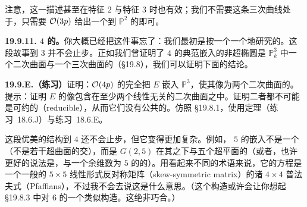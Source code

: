 注意，这一描述甚至在特征 $2$ 与特征 $3$ 时也有效；我们不需要这条三次曲线处于\trWeierstrassNormalForm，只需要 $\mathcal{O}(3p)$ 给出一个到 $\mathbb{P}^2$ 的\trClosedEmbedding{}即可。

\textbf{19.9.11. \trDegree{} $4$ 的\trLineBundle。}\quad 你大概已经把这件事忘了：我们最初是按\trDegree{}一个一个地研究\trLineBundle{}的。这段故事到\trDegree{} $3$ 并不会止步。正如我们曾证明了\trGenus{} $4$ 的典范嵌入的非超椭圆\trCurve{}是 $\mathbb{P}^3_k$ 中一个二次曲面与一个三次曲面的\trCompleteIntersection（\S19.8），我们可以证明下面的结论。

\textbf{19.9.E.（练习）}\quad 证明：$\mathcal{O}(4p)$ 的完全\trLinearSystem{}把 $E$ 嵌入 $\mathbb{P}^3$，使其像为两个二次曲面的\trCompleteIntersection。提示：证明 $E$ 的像包含在至少两个线性无关的二次曲面之中。证明二者都不可能是可约的（reducible），从而它们没有公共的\trIrreducibleComponent。仿照 \S19.8.1，使用\trBezout{}定理（\mbox{练习~18.6.J}）与\mbox{练习~18.6.E}。

这段优美的结构到\trDegree{} $4$ 还不会止步，但它变得更加复杂。例如，\trDegree{} $5$ 的嵌入不是一个\trCompleteIntersection（不是若干超曲面的交），而是 $G(2,5)$ 在其\trPluckerEmbedding{}之下与五个超平面的\trCompleteIntersection（或者，也许更好的说法是，与一个余维数为 $5$ 的\trLinearSpace{}的\trCompleteIntersection）。用看起来不同的术语来说，它的方程是一个一般的 $5\times 5$ 线性形式反对称矩阵（skew-symmetric matrix）的诸 $4\times 4$ 普法夫式（Pfaffians），不过我不会去说这是什么意思。（这个构造或许会让你想起 \S19.8.3 中对\trGenus{} $6$ \trCurve{}的一个类似构造。这绝非巧合。）
